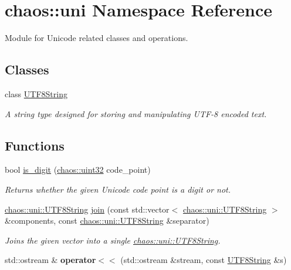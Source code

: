 \hypertarget{namespacechaos_1_1uni}{}\section{chaos\+:\+:uni Namespace Reference}
\label{namespacechaos_1_1uni}


Module for Unicode related classes and operations.  


\subsection*{Classes}
\begin{DoxyCompactItemize}
\item 
class \hyperlink{classchaos_1_1uni_1_1_u_t_f8_string}{U\+T\+F8\+String}
\begin{DoxyCompactList}\small\item\em A string type designed for storing and manipulating U\+T\+F-\/8 encoded text. \end{DoxyCompactList}\end{DoxyCompactItemize}
\subsection*{Functions}
\begin{DoxyCompactItemize}
\item 
bool \hyperlink{namespacechaos_1_1uni_a25a7549a0378aeac227c881220c23640}{is\+\_\+digit} (\hyperlink{namespacechaos_a3b3a47ba1e284655bf1a30c441121c60}{chaos\+::uint32} code\+\_\+point)
\begin{DoxyCompactList}\small\item\em Returns whether the given Unicode code point is a digit or not. \end{DoxyCompactList}\item 
\hyperlink{classchaos_1_1uni_1_1_u_t_f8_string}{chaos\+::uni\+::\+U\+T\+F8\+String} \hyperlink{namespacechaos_1_1uni_ad2a77983423c8b10e2b18cae6f35d329}{join} (const std\+::vector$<$ \hyperlink{classchaos_1_1uni_1_1_u_t_f8_string}{chaos\+::uni\+::\+U\+T\+F8\+String} $>$ \&components, const \hyperlink{classchaos_1_1uni_1_1_u_t_f8_string}{chaos\+::uni\+::\+U\+T\+F8\+String} \&separator)
\begin{DoxyCompactList}\small\item\em Joins the given vector into a single \hyperlink{classchaos_1_1uni_1_1_u_t_f8_string}{chaos\+::uni\+::\+U\+T\+F8\+String}. \end{DoxyCompactList}\item 
\hypertarget{namespacechaos_1_1uni_ab20a8223562ec1ee8f663bda07c7a3ad}{}std\+::ostream \& {\bfseries operator$<$$<$} (std\+::ostream \&stream, const \hyperlink{classchaos_1_1uni_1_1_u_t_f8_string}{U\+T\+F8\+String} \&s)\label{namespacechaos_1_1uni_ab20a8223562ec1ee8f663bda07c7a3ad}

\end{DoxyCompactItemize}


